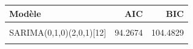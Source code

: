 \centering
\centering
\begin{tabular}[t]{lrr}
\toprule
Modèle & AIC & BIC\\
\midrule
\cellcolor{gray!10}{SARIMA(2,1,2)(2,0,1)[12]} & \cellcolor{gray!10}{99.0123} & \cellcolor{gray!10}{119.4434}\\
SARIMA(0,1,0)(2,0,1)[12] & 94.2674 & 104.4829\\
\cellcolor{gray!10}{SARIMA(1,1,1)(2,0,1)[12]} & \cellcolor{gray!10}{97.3930} & \cellcolor{gray!10}{112.7162}\\
\bottomrule
\end{tabular}

